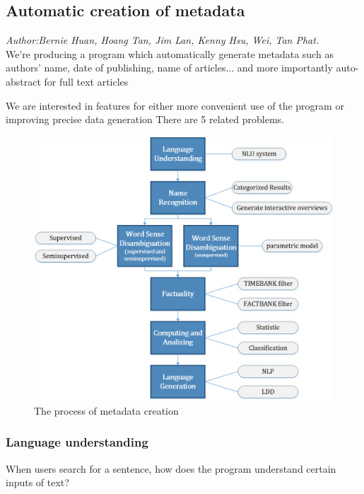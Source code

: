 %  
% 
% 

\subsection{Automatic creation of metadata}
\textit{\footnotesize Author:Bernie Huan, Hoang Tan, Jim Lan, Kenny Hsu, Wei, Tan Phat.}\\

We're producing a program which automatically generate metadata such as authors' name, date of publishing, name of articles... and more importantly auto-abstract for full text articles

We are interested in features for either more convenient use of the program or improving precise data generation
There are 5 related problems.

\begin{figure}
	\caption{The process of metadata creation}
\begin{center}
	\includegraphics[width=\columnwidth]{UnionChart}
\end{center}
\end{figure}

\subsubsection*{Language understanding}
When users search for a sentence, how does the program understand certain inputs of text? 

